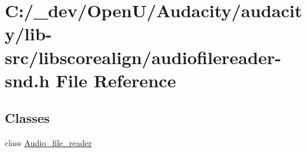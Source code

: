 \hypertarget{audiofilereader-snd_8h}{}\section{C\+:/\+\_\+dev/\+Open\+U/\+Audacity/audacity/lib-\/src/libscorealign/audiofilereader-\/snd.h File Reference}
\label{audiofilereader-snd_8h}
\subsection*{Classes}
\begin{DoxyCompactItemize}
\item 
class \hyperlink{class_audio__file__reader}{Audio\+\_\+file\+\_\+reader}
\end{DoxyCompactItemize}
